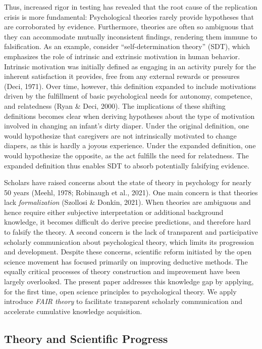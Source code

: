 \documentclass[
  man, noextraspace,floatsintext]{apa7}
\begin{document}
Thus, increased rigor in testing has revealed that the root cause of the replication crisis is more fundamental:
Psychological theories rarely provide hypotheses that are corroborated by evidence.
Furthermore, theories are often so ambiguous that they can accommodate mutually inconsistent findings,
rendering them immune to falsification.
As an example, consider ``self-determination theory'' (SDT), which emphasizes the role of intrinsic and extrinsic motivation in human behavior.
Intrinsic motivation was initially defined as engaging in an activity purely for the inherent satisfaction it provides, free from any external rewards or pressures (Deci, 1971).
Over time, however, this definition expanded to include motivations driven by the fulfillment of basic psychological needs for autonomy, competence, and relatedness (Ryan \& Deci, 2000).
The implications of these shifting definitions becomes clear when deriving hypotheses about the type of motivation involved in changing an infant's dirty diaper.
Under the original definition, one would hypothesize that caregivers are not intrinsically motivated to change diapers, as this is hardly a joyous experience.
Under the expanded definition, one would hypothesize the opposite, as the act fulfills the need for relatedness.
The expanded definition thus enables SDT to absorb potentially falsifying evidence.

Scholars have raised concerns about the state of theory in psychology for nearly 50 years (Meehl, 1978; Robinaugh et al., 2021).
One main concern is that theories lack \emph{formalization} (Szollosi \& Donkin, 2021).
When theories are ambiguous and hence require either subjective interpretation or additional background knowledge,
it becomes difficult do derive precise predictions,
and therefore hard to falsify the theory.
A second concern is the lack of transparent and participative scholarly communication about psychological theory, which limits its progression and development.
Despite these concerns, scientific reform initiated by the open science movement has focused primarily on improving deductive methods.
The equally critical processes of theory construction and improvement have been largely overlooked.
The present paper addresses this knowledge gap by applying, for the first time,
open science principles to psychological theory.
We apply introduce \emph{FAIR theory} to
facilitate transparent scholarly communication and accelerate cumulative knowledge acquisition.

\subsection{Theory and Scientific Progress}\label{theory-and-scientific-progress}
\end{document}
